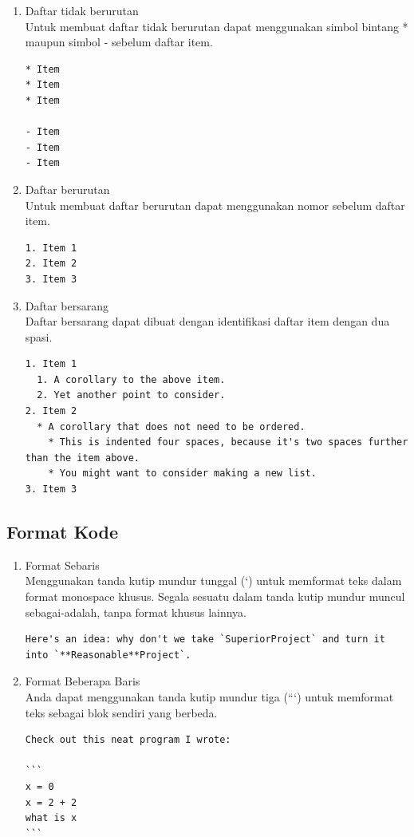 \begin{enumerate}
\item Daftar tidak berurutan\\
Untuk membuat daftar tidak berurutan dapat menggunakan simbol bintang * maupun simbol - sebelum daftar item.
\begin{lstlisting}
* Item
* Item
* Item

- Item
- Item
- Item
\end{lstlisting}
\item Daftar berurutan\\
Untuk membuat daftar berurutan dapat menggunakan nomor sebelum daftar item.
\begin{lstlisting}
1. Item 1
2. Item 2
3. Item 3
\end{lstlisting}
\item Daftar bersarang\\
Daftar bersarang dapat dibuat dengan identifikasi daftar item dengan dua spasi.
\begin{lstlisting}
1. Item 1
  1. A corollary to the above item.
  2. Yet another point to consider.
2. Item 2
  * A corollary that does not need to be ordered.
    * This is indented four spaces, because it's two spaces further than the item above.
    * You might want to consider making a new list.
3. Item 3
\end{lstlisting}
\end{enumerate}

\subsection{Format Kode}

\begin{enumerate}
\item Format Sebaris\\
Menggunakan tanda kutip mundur tunggal (`) untuk memformat teks dalam format monospace khusus. Segala sesuatu dalam tanda kutip mundur muncul sebagai-adalah, tanpa format khusus lainnya.
\begin{lstlisting}
Here's an idea: why don't we take `SuperiorProject` and turn it into `**Reasonable**Project`.
\end{lstlisting}
\item Format Beberapa Baris\\
Anda dapat menggunakan tanda kutip mundur tiga (```) untuk memformat teks sebagai blok sendiri yang berbeda.
\begin{lstlisting}
Check out this neat program I wrote:

```
x = 0
x = 2 + 2
what is x
```
\end{lstlisting}
\end{enumerate}

